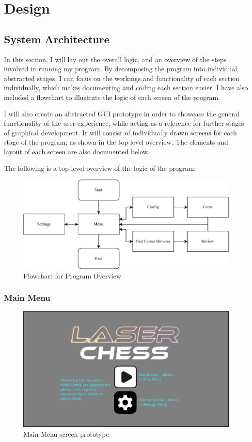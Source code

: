 \documentclass[../main/main.tex]{subfiles}
\begin{document}
\newpage

\chapter{Design}
\section{System Architecture}
In this section, I will lay out the overall logic, and an overview of the steps involved in running my program. By decomposing the program into individual abstracted stages, I can focus on the workings and functionality of each section individually, which makes documenting and coding each section easier. I have also included a flowchart to illustrate the logic of each screen of the program.

I will also create an abstracted GUI prototype in order to showcase the general functionality of the user experience, while acting as a reference for further stages of graphical development. It will consist of individually drawn screens for each stage of the program, as shown in the top-level overview. The elements and layout of each screen are also documented below.

The following is a top-level overview of the logic of the program:

\begin{figure}[H]
    \centering
    \includegraphics[width=\columnwidth]{../design/assets/top_level_overview_flowchart.pdf}
    \caption{Flowchart for Program Overview}
    \label{fig:program-overview-flowchart}
\end{figure}

\subsection{Main Menu}
\begin{figure}[H]
    \centering
    \includegraphics[width=0.8\columnwidth]{../design/assets/menu_gui.png}
    \caption{Main Menu screen prototype}
    \label{fig:menu-gui}
\end{figure}
\end{document}
